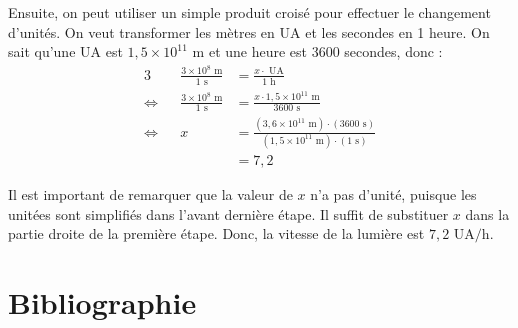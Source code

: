 \documentclass[11pt]{article}
\begin{document}
\pagebreak
Ensuite, on peut utiliser un simple produit croisé pour effectuer le changement d'unités. On veut transformer les mètres en UA et les secondes en 1 heure. On sait qu'une UA est $1,5\times10^{11}\text{ m}$ et une heure est 3600 secondes, donc :
\begin{alignat*}{3}
                & & \frac{3\times10^8\text{ m}}{1\text{ s}}&=\frac{x\cdot\text{ UA}}{1\text{ h}}\\
\Leftrightarrow & & \frac{3\times10^8\text{ m}}{1\text{ s}}&=\frac{x\cdot1,5\times10^{11}\text{ m}}{3600\text{ s}}\\
\Leftrightarrow & &                                       x&=\frac{(3,6\times10^{11}\text{ m})\cdot(3600\text{ s})}{(1,5\times10^{11}\text{ m})\cdot(1\text{ s})}\\
                & &                                        &=7,2
\end{alignat*}

Il est important de remarquer que la valeur de $x$ n'a pas d'unité, puisque les unitées sont simplifiés dans l'avant dernière étape. Il suffit de substituer $x$ dans la partie droite de la première étape. Donc, la vitesse de la lumière est $7,2\text{ UA/h}$.
\section*{Bibliographie}

\renewcommand{\section}[2]{}

\end{document}
